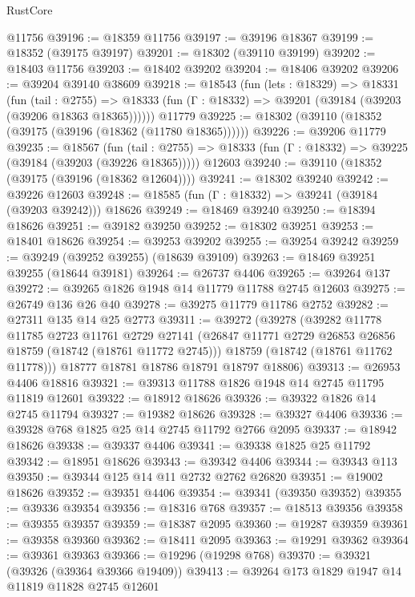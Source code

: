 \begin{lexlean}{RustCore}
\begin{coremodule}
    @11756
@39196 := @18359 @11756
@39197 := @39196 @18367
@39199 := @18352 (@39175 @39197)
@39201 := @18302 (@39110 @39199)
@39202 := @18403 @11756
@39203 := @18402 @39202
@39204 := @18406 @39202
@39206 := @39204 @39140 @38609
@39218 := @18543
    (fun (lets : @18329) =>
    @18331
      (fun (tail : @2755) =>
      @18333 (fun (Γ : @18332) => @39201 (@39184 (@39203 (@39206 @18363 @18365))))))
    @11779
@39225 := @18302 (@39110 (@18352 (@39175 (@39196 (@18362 (@11780 @18365))))))
@39226 := @39206 @11779
@39235 := @18567
    (fun (tail : @2755) => @18333 (fun (Γ : @18332) => @39225 (@39184 (@39203 (@39226 @18365)))))
    @12603
@39240 := @39110 (@18352 (@39175 (@39196 (@18362 @12604))))
@39241 := @18302 @39240
@39242 := @39226 @12603
@39248 := @18585 (fun (Γ : @18332) => @39241 (@39184 (@39203 @39242))) @18626
@39249 := @18469 @39240
@39250 := @18394 @18626
@39251 := @39182 @39250
@39252 := @18302 @39251
@39253 := @18401 @18626
@39254 := @39253 @39202
@39255 := @39254 @39242
@39259 := @39249 (@39252 @39255) (@18639 @39109)
@39263 := @18469 @39251 @39255 (@18644 @39181)
@39264 := @26737 @4406
@39265 := @39264 @137
@39272 := @39265 @1826 @1948 @14 @11779 @11788 @2745 @12603
@39275 := @26749 @136 @26 @40
@39278 := @39275 @11779 @11786 @2752
@39282 := @27311 @135 @14 @25 @2773
@39311 := @39272
    (@39278
      (@39282
        @11778
        @11785
        @2723
        @11761
        @2729
        @27141
        (@26847 @11771 @2729 @26853 @26856 @18759 (@18742 (@18761 @11772 @2745)))
        @18759
        (@18742 (@18761 @11762 @11778)))
      @18777
      @18781
      @18786
      @18791
      @18797
      @18806)
@39313 := @26953 @4406 @18816
@39321 := @39313 @11788 @1826 @1948 @14 @2745 @11795 @11819 @12601
@39322 := @18912 @18626
@39326 := @39322 @1826 @14 @2745 @11794
@39327 := @19382 @18626
@39328 := @39327 @4406
@39336 := @39328 @768 @1825 @25 @14 @2745 @11792 @2766 @2095
@39337 := @18942 @18626
@39338 := @39337 @4406
@39341 := @39338 @1825 @25 @11792
@39342 := @18951 @18626
@39343 := @39342 @4406
@39344 := @39343 @113
@39350 := @39344 @125 @14 @11 @2732 @2762 @26820
@39351 := @19002 @18626
@39352 := @39351 @4406
@39354 := @39341 (@39350 @39352)
@39355 := @39336 @39354
@39356 := @18316 @768
@39357 := @18513 @39356
@39358 := @39355 @39357
@39359 := @18387 @2095
@39360 := @19287 @39359
@39361 := @39358 @39360
@39362 := @18411 @2095
@39363 := @19291 @39362
@39364 := @39361 @39363
@39366 := @19296 (@19298 @768)
@39370 := @39321 (@39326 (@39364 @39366 @19409))
@39413 := @39264
    @173
    @1829
    @1947
    @14
    @11819
    @11828
    @2745
    @12601

\end{coremodule}
\end{lexlean}
